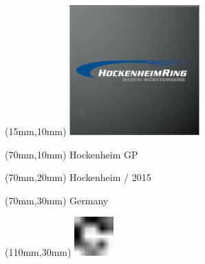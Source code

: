 \null\newpage
\begin{textblock*}{50mm}(15mm,10mm)%
\includegraphics[width=50mm]{LG/2015-05-20_00082.png}
\end{textblock*}
\begin{textblock*}{130mm}(70mm,10mm)%
{\fontsize{20}{20}\selectfont Hockenheim GP}\\
\end{textblock*}
\begin{textblock*}{120mm}(70mm,20mm)%
{\fontsize{16}{16}\selectfont Hockenheim / 2015}\\
\end{textblock*}
\begin{textblock*}{120mm}(70mm,30mm)%
{\fontsize{12}{12}\selectfont Germany}
\end{textblock*}
\begin{textblock*}{30mm}(110mm,30mm)%
\centering
\includegraphics[height=15mm]{icons/fa-rotate-right.pdf}
\end{textblock*}
